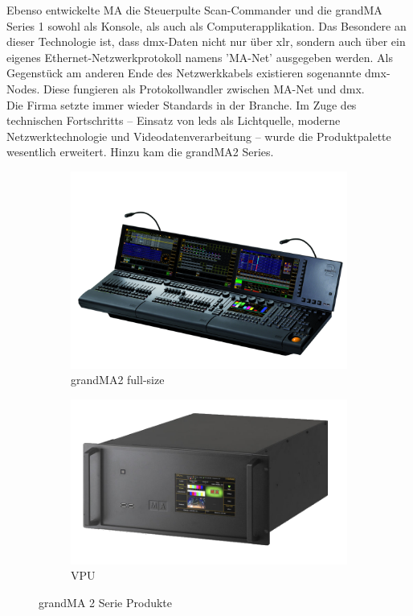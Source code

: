 \documentclass[11pt]{scrartcl}
\begin{document}
\noindent
Ebenso entwickelte MA die Steuerpulte Scan-Commander und die grandMA Series 1 sowohl als
Konsole, als auch als Computerapplikation. Das Besondere an dieser Technologie ist, dass \ac{dmx}-Daten
nicht nur über \ac{xlr}, sondern auch über ein eigenes Ethernet-Netzwerkprotokoll namens 'MA-Net'
ausgegeben werden. Als Gegenstück am anderen Ende des Netzwerkkabels existieren sogenannte
\ac{dmx}-Nodes. Diese fungieren als Protokollwandler zwischen MA-Net und \ac{dmx}.\\
Die Firma setzte immer wieder Standards in der Branche. Im Zuge des technischen Fortschritts –
Einsatz von \ac{led}s als Lichtquelle, moderne Netzwerktechnologie und Videodatenverarbeitung –
wurde die Produktpalette wesentlich erweitert. Hinzu kam die grandMA2 Series.\\
\begin{figure}[H]
    \centering
    \begin{subfigure}[b]{0.45\textwidth}
        \includegraphics[width=\textwidth]{images/MA_grandMA2_full-size.png}
        \caption{grandMA2 full-size}
    \end{subfigure}
    \hfill 
    \begin{subfigure}[b]{0.4\textwidth}
        \includegraphics[width=\textwidth]{images/MA-VPU-plus_d.png}
        \caption{VPU \cite{gma2products}}
    \end{subfigure}
    \caption{grandMA 2 Serie Produkte}\label{fig:gma2}
\end{figure}
\end{document}
